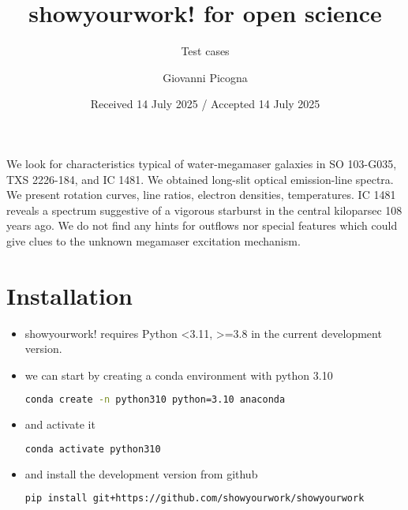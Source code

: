 \documentclass{aa}
\begin{document}
\title{showyourwork! for open science}

\subtitle{Test cases}

\author{Giovanni Picogna}


\date{Received 14 July 2025 / Accepted 14 July 2025}

\abstract {} {We look for characteristics typical of water-megamaser galaxies
in SO 103-G035, TXS 2226-184, and IC 1481.} {We obtained long-slit optical
emission-line spectra.} {We present rotation curves, line ratios, electron
densities, temperatures. IC 1481 reveals a spectrum suggestive of a vigorous
starburst in the central kiloparsec 108 years ago.} {We do not find any hints
for outflows nor special features which could give clues to the unknown
megamaser excitation mechanism.}

\maketitle 

\section{Installation}
\label{sec:intro}
\begin{itemize}
\item showyourwork! requires Python <3.11, >=3.8 in the current development version.
\item we can start by creating a conda environment with python 3.10
  \begin{lstlisting}[language=bash]
    conda create -n python310 python=3.10 anaconda
  \end{lstlisting}
\item and activate it
  \begin{lstlisting}[language=bash]
    conda activate python310
  \end{lstlisting}
\item and install the development version from github
  \begin{lstlisting}[language=bash]
    pip install git+https://github.com/showyourwork/showyourwork
  \end{lstlisting}
\end{itemize}
\end{document}
